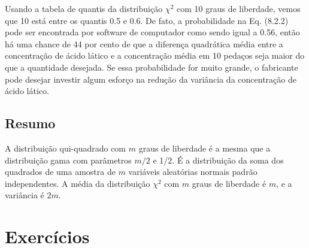 Usando a tabela de quantis da distribuição $\chi^2$ com 10 graus de liberdade, vemos que 10 está entre os quantis 0.5 e 0.6. De fato, a probabilidade na Eq. (8.2.2) pode ser encontrada por software de computador como sendo igual a 0.56, então há uma chance de 44 por cento de que a diferença quadrática média entre a concentração de ácido lático e a concentração média em 10 pedaços seja maior do que a quantidade desejada. Se essa probabilidade for muito grande, o fabricante pode desejar investir algum esforço na redução da variância da concentração de ácido lático.

\subsection*{Resumo}

A distribuição qui-quadrado com $m$ graus de liberdade é a mesma que a distribuição gama com parâmetros $m/2$ e 1/2. É a distribuição da soma dos quadrados de uma amostra de $m$ variáveis aleatórias normais padrão independentes. A média da distribuição $\chi^2$ com $m$ graus de liberdade é $m$, e a variância é $2m$.

\section*{Exercícios}

